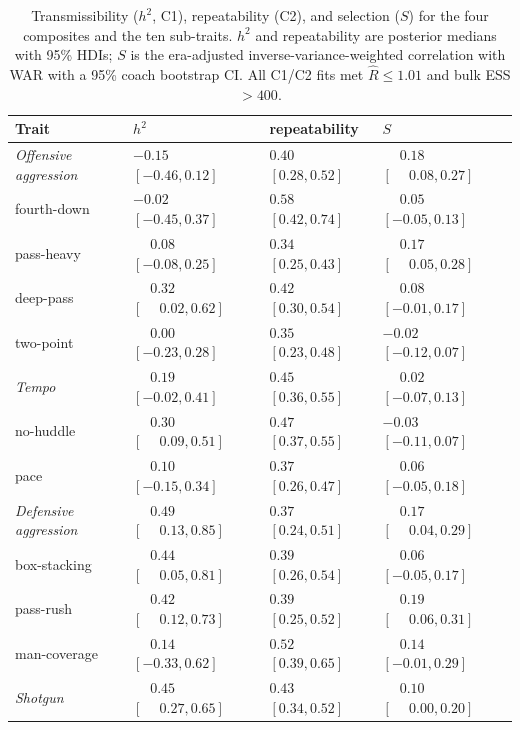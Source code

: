 \documentclass[
  journal=ehs,
  manuscript=article,
  year=2026,
  volume=8,
]{cup-journal}
\begin{document}
\begin{table}[t]
\centering
\caption{Transmissibility ($h^{2}$, C1), repeatability (C2), and selection ($S$)
for the four composites and the ten sub-traits. $h^{2}$ and repeatability are
posterior medians with 95\% HDIs; $S$ is the era-adjusted inverse-variance-weighted
correlation with WAR with a 95\% coach bootstrap CI. All C1/C2 fits met
$\hat{R}\le1.01$ and bulk ESS $>400$.}
\label{tab:main}
\begin{tabular}{llll}
\toprule
Trait & $h^{2}$ & repeatability & $S$ \\
\midrule
\textit{Offensive aggression} & $-0.15$ $[-0.46,0.12]$ & $0.40$ $[0.28,0.52]$ & $\phantom{-}0.18$ $[\phantom{-}0.08,0.27]$ \\
\quad fourth-down   & $-0.02$ $[-0.45,0.37]$ & $0.58$ $[0.42,0.74]$ & $\phantom{-}0.05$ $[-0.05,0.13]$ \\
\quad pass-heavy    & $\phantom{-}0.08$ $[-0.08,0.25]$ & $0.34$ $[0.25,0.43]$ & $\phantom{-}0.17$ $[\phantom{-}0.05,0.28]$ \\
\quad deep-pass     & $\phantom{-}0.32$ $[\phantom{-}0.02,0.62]$ & $0.42$ $[0.30,0.54]$ & $\phantom{-}0.08$ $[-0.01,0.17]$ \\
\quad two-point     & $\phantom{-}0.00$ $[-0.23,0.28]$ & $0.35$ $[0.23,0.48]$ & $-0.02$ $[-0.12,0.07]$ \\
\textit{Tempo}      & $\phantom{-}0.19$ $[-0.02,0.41]$ & $0.45$ $[0.36,0.55]$ & $\phantom{-}0.02$ $[-0.07,0.13]$ \\
\quad no-huddle     & $\phantom{-}0.30$ $[\phantom{-}0.09,0.51]$ & $0.47$ $[0.37,0.55]$ & $-0.03$ $[-0.11,0.07]$ \\
\quad pace          & $\phantom{-}0.10$ $[-0.15,0.34]$ & $0.37$ $[0.26,0.47]$ & $\phantom{-}0.06$ $[-0.05,0.18]$ \\
\textit{Defensive aggression} & $\phantom{-}0.49$ $[\phantom{-}0.13,0.85]$ & $0.37$ $[0.24,0.51]$ & $\phantom{-}0.17$ $[\phantom{-}0.04,0.29]$ \\
\quad box-stacking  & $\phantom{-}0.44$ $[\phantom{-}0.05,0.81]$ & $0.39$ $[0.26,0.54]$ & $\phantom{-}0.06$ $[-0.05,0.17]$ \\
\quad pass-rush     & $\phantom{-}0.42$ $[\phantom{-}0.12,0.73]$ & $0.39$ $[0.25,0.52]$ & $\phantom{-}0.19$ $[\phantom{-}0.06,0.31]$ \\
\quad man-coverage  & $\phantom{-}0.14$ $[-0.33,0.62]$ & $0.52$ $[0.39,0.65]$ & $\phantom{-}0.14$ $[-0.01,0.29]$ \\
\textit{Shotgun}    & $\phantom{-}0.45$ $[\phantom{-}0.27,0.65]$ & $0.43$ $[0.34,0.52]$ & $\phantom{-}0.10$ $[\phantom{-}0.00,0.20]$ \\
\bottomrule
\end{tabular}
\end{table}
\end{document}
